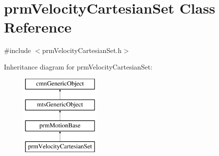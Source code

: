 \hypertarget{classprm_velocity_cartesian_set}{}\section{prm\+Velocity\+Cartesian\+Set Class Reference}
\label{classprm_velocity_cartesian_set}


{\ttfamily \#include $<$prm\+Velocity\+Cartesian\+Set.\+h$>$}

Inheritance diagram for prm\+Velocity\+Cartesian\+Set\+:\begin{figure}[H]
\begin{center}
\leavevmode
\includegraphics[height=4.000000cm]{d1/dd2/classprm_velocity_cartesian_set}
\end{center}
\end{figure}
